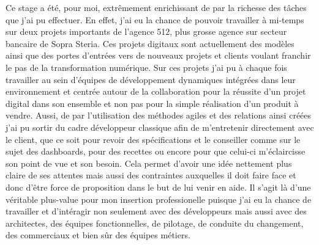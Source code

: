 \newenvironment{changemargin}[2]{%
\begin{list}{}{%
\setlength{\topsep}{0pt}%
\setlength{\leftmargin}{#1}%
\setlength{\rightmargin}{#2}%
\setlength{\listparindent}{\parindent}%
\setlength{\itemindent}{\parindent}%
\setlength{\parsep}{\parskip}%
}%
\item[]}{\end{list}}

\begin{changemargin}{-1cm}{-1cm}

	Ce stage a été, pour moi, extrêmement enrichissant de par la richesse des tâches que j'ai pu effectuer. En effet, j'ai eu la chance de pouvoir travailler à mi-temps sur deux projets importants de l'agence 512, plus grosse agence sur secteur bancaire de Sopra Steria. Ces projets digitaux sont actuellement des modèles ainsi que des portes d'entrées vers de nouveaux projets et clients voulant franchir le pas de la transformation numérique. Sur ces projets j'ai pu à chaque fois travailler au sein d'équipes de développement dynamiques intégrées dans leur environnement et centrée autour de la collaboration pour la réussite d'un projet digital dans son ensemble et non pas pour la simple réalisation d'un produit à vendre. Aussi, de par l'utilisation des méthodes agiles et des relations ainsi créées j'ai pu sortir du cadre développeur classique afin de m'entretenir directement avec le client, que ce soit pour revoir des spécifications et le conseiller comme sur le sujet des dashboards, pour des recettes ou encore pour que celui-ci m'éclaircisse son point de vue et son besoin. Cela permet d'avoir une idée nettement plus claire de ses attentes mais aussi des contraintes auxquelles il doit faire face et donc d'être force de proposition dans le but de lui venir en aide. Il s'agit là d'une véritable plus-value pour mon insertion professionelle puisque j'ai eu la chance de travailler et d'intéragir non seulement avec des développeurs mais aussi avec des architectes, des équipes fonctionnelles, de pilotage, de conduite du changement, des commerciaux et bien sûr des équipes métiers. \\
	

\end{changemargin}

